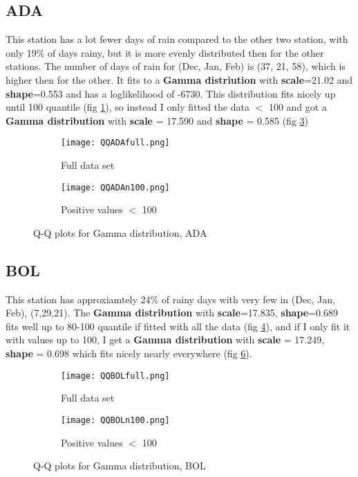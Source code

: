 \documentclass{article}
\begin{document}
	\subsection{ADA}
	This station has a lot fewer days of rain compared to the other two station, with only 19\% of days rainy, but it is more evenly distributed then for the other stations. The number of days of rain for (Dec, Jan, Feb) is (37, 21, 58), which is higher then for the other. It fits to a \textbf{Gamma distriution} with \textbf{scale}=21.02 and \textbf{shape}=0.553 and has a loglikelihood of -6730. This distribution fits nicely up until 100 quantile (fig \ref{GammaADA}), so instead I only fitted the data $<$ 100 and got a \textbf{Gamma distribution} with \textbf{scale} = 17.590 and \textbf{shape} = 0.585 (fig \ref{GammaADAn100})
	\begin{figure}[H]
		\centering
		\begin{subfigure}{0.5\textwidth}
			\centering
			\texttt{[image: QQADAfull.png]}
			\caption{Full data set}
			\label{GammaADA}
		\end{subfigure}%
		\begin{subfigure}{0.5\textwidth}
			\centering
			\texttt{[image: QQADAn100.png]}
			\caption{Positive values $<$ 100}
			\label{GammaADAn100}
		\end{subfigure}
		\caption{Q-Q plots for Gamma distribution, ADA}
	\end{figure}
 	\subsection{BOL}
 	This station has approxiamtely 24\% of rainy days with very few in (Dec, Jan, Feb), (7,29,21). The \textbf{Gamma distribution} with \textbf{scale}=17.835, \textbf{shape}=0.689 fits well up to 80-100 quantile if fitted with all the data (fig \ref{GammaBOL}), and if I only fit it with values up to 100, I get a \textbf{Gamma distribution} with \textbf{scale} = 17.249, \textbf{shape} = 0.698 which fits nicely nearly everywhere (fig \ref{GammaBOLn100}).
 	\begin{figure}[H]
 		\centering
 		\begin{subfigure}{0.5\textwidth}
 			\centering
 			\texttt{[image: QQBOLfull.png]}
 			\caption{Full data set}
 			\label{GammaBOL}
 		\end{subfigure}%
 		\begin{subfigure}{0.5\textwidth}
 			\centering
 			\texttt{[image: QQBOLn100.png]}
 			\caption{Positive values $<$ 100}
 			\label{GammaBOLn100}
 		\end{subfigure}
 		\caption{Q-Q plots for Gamma distribution, BOL}
 	\end{figure}
\end{document}
